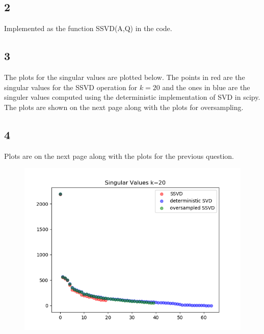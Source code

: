 \documentclass[paper=a4, fontsize=11pt]{scrartcl} %
\numberwithin{figure}{section} %
\numberwithin{table}{section} %
\begin{document}
\subsection*{2}
 Implemented as the function SSVD(A,Q) in the code.\\

\subsection*{3}

 The plots for the singular values are plotted below. The points in red are the singular values for the SSVD operation for $k=20$ and the ones in blue are the singuler values computed using the deterministic implementation of SVD in scipy. The plots are shown on the next page along with the plots for oversampling.\\


\subsection*{4}
Plots are on the next page along with the plots for the previous question.

\begin{figure}[H]

\includegraphics{sing_values_0.png}
\end{figure}
\end{document}
